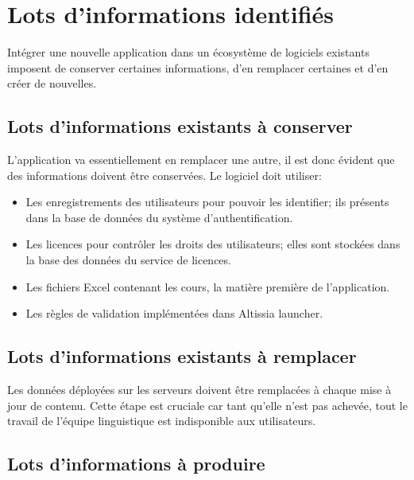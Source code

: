 \section{Lots d'informations identifiés}
\label{sec:identified-information-packages}
    Intégrer une nouvelle application dans un écosystème de logiciels existants imposent de conserver certaines informations, d'en remplacer certaines et d'en créer de nouvelles.

\subsection{Lots d’informations existants à conserver}
\label{ssec:existing-information-packages-to-keep}
    L'application va essentiellement en remplacer une autre, il est donc évident que des informations doivent être conservées.
    Le logiciel doit utiliser:
    \begin{itemize}
        \item Les enregistrements des utilisateurs pour pouvoir les identifier; ils présents dans la base de données du système d'authentification.
        \item Les licences pour contrôler les droits des utilisateurs; elles sont stockées dans la base des données du service de licences.
        \item Les fichiers Excel contenant les cours, la matière première de l'application\fnmark.
        \item Les règles de validation implémentées dans Altissia launcher\fnmark.
    \end{itemize}
    

\subsection{Lots d’informations existants à remplacer}
\label{ssec:existing-information-packages-to-replace}

    Les données déployées sur les serveurs doivent être remplacées à chaque mise à jour de contenu.
    Cette étape est cruciale car tant qu'elle n'est pas achevée, tout le travail de l'équipe linguistique est indisponible aux utilisateurs.

\subsection{Lots d’informations à produire}
\label{ssec:information-packages-to-produce}

